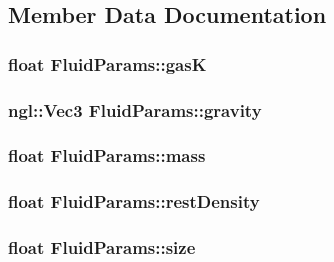\subsection{Member Data Documentation}
\hypertarget{structFluidParams_ac46f0843400e4572ee50626d35f0998b}{
\subsubsection[{gasK}]{\setlength{\rightskip}{0pt plus 5cm}float {\bf FluidParams::gasK}}}
\label{structFluidParams_ac46f0843400e4572ee50626d35f0998b}
\hypertarget{structFluidParams_afc347a2b82c0202ffabf71d7d98f37e8}{
\subsubsection[{gravity}]{\setlength{\rightskip}{0pt plus 5cm}ngl::Vec3 {\bf FluidParams::gravity}}}
\label{structFluidParams_afc347a2b82c0202ffabf71d7d98f37e8}
\hypertarget{structFluidParams_a7fab0efaff51c1fd3eb123db1cab3b16}{
\subsubsection[{mass}]{\setlength{\rightskip}{0pt plus 5cm}float {\bf FluidParams::mass}}}
\label{structFluidParams_a7fab0efaff51c1fd3eb123db1cab3b16}
\hypertarget{structFluidParams_a0bddcb531ccd9d80c119f847556c89c6}{
\subsubsection[{restDensity}]{\setlength{\rightskip}{0pt plus 5cm}float {\bf FluidParams::restDensity}}}
\label{structFluidParams_a0bddcb531ccd9d80c119f847556c89c6}
\hypertarget{structFluidParams_a4f9a314397d4ef6450744a91398c8a62}{
\subsubsection[{size}]{\setlength{\rightskip}{0pt plus 5cm}float {\bf FluidParams::size}}}
\label{structFluidParams_a4f9a314397d4ef6450744a91398c8a62}
